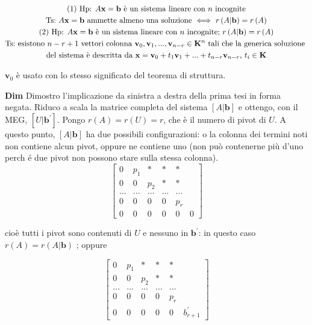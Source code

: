\documentclass{article}
\begin{document}
\begin{gather*}
\text{(1) Hp}\text{: }A\mathbf{x}=\mathbf{b}\text{ \`{e} un sistema lineare
con }n\text{ incognite} \\
\text{Ts}\text{:}\text{ }A\mathbf{x}=\mathbf{b}\text{ ammette almeno una
soluzione }\Longleftrightarrow \text{ }r\left( A|\mathbf{b}\right) =r\left(
A\right)  \\
\text{(2) Hp}\text{: }A\mathbf{x}=\mathbf{b}\text{ \`{e} un sistema lineare
con }n\text{ incognite; }r\left( A|\mathbf{b}\right) =r\left( A\right)  \\
\text{Ts}\text{:}\text{ esistono }n-r+1\text{ vettori colonna }\mathbf{v}%
_{0},\mathbf{v}_{1},...,\mathbf{v}_{n-r}\in \mathbf{K}^{n}\text{ tali che la
generica soluzione } \\
\text{del sistema \`{e} descritta da }\mathbf{x}=\mathbf{v}_{0}+t_{1}\mathbf{%
v}_{1}+...+t_{n-r}\mathbf{v}_{n-r}\text{, }t_{i}\in \mathbf{K}
\end{gather*}

$\mathbf{v}_{0}$ \`{e} usato con lo stesso significato del teorema di
struttura.

\textbf{Dim} Dimostro l'implicazione da sinistra a destra della prima tesi
in forma negata. Riduco a scala la matrice completa del sistema $\left[ A|%
\mathbf{b}\right] $ e ottengo, con il MEG, $\left[ U|\mathbf{b}^{\prime }%
\right] $. Pongo $r\left( A\right) =r\left( U\right) =r$, che \`{e} il
numero di pivot di $U$. A questo punto, $\left[ A|\mathbf{b}\right] $ ha due
possibili configurazioni: o la colonna dei termini noti non contiene alcun
pivot, oppure ne contiene uno (non pu\`{o} contenerne pi\`{u} d'uno perch%
\'{e} due pivot non possono stare sulla stessa colonna).%
\begin{equation*}
\left[ 
\begin{array}{cccccc}
0 & p_{1} & \ast & \ast & \ast &  \\ 
0 & 0 & p_{2} & \ast & \ast &  \\ 
... & ... & ... & ... & ... &  \\ 
0 & 0 & 0 & 0 & p_{r} &  \\ 
0 & 0 & 0 & 0 & 0 & 0%
\end{array}%
\right]
\end{equation*}

cio\`{e} tutti i pivot sono contenuti di $U$ e nessuno in $\mathbf{b}%
^{\prime }$: in questo caso $r\left( A\right) =r\left( A|\mathbf{b}\right) $%
; oppure

\begin{equation*}
\left[ 
\begin{array}{cccccc}
0 & p_{1} & \ast & \ast & \ast &  \\ 
0 & 0 & p_{2} & \ast & \ast &  \\ 
... & ... & ... & ... & ... &  \\ 
0 & 0 & 0 & 0 & p_{r} &  \\ 
0 & 0 & 0 & 0 & 0 & b_{r+1}^{\prime }%
\end{array}%
\right]
\end{equation*}
\end{document}
